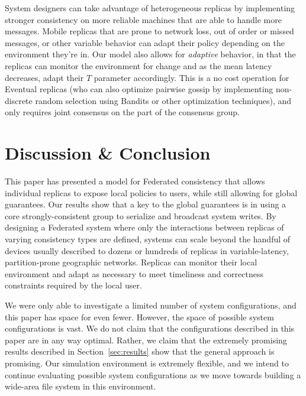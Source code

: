 \documentclass[10pt,conference,letterpaper]{IEEEtran}
\begin{document}
System designers can take advantage of heterogeneous replicas by implementing
stronger consistency on more reliable machines that are able to handle more
messages.
Mobile replicas that are prone to network loss, out of order or missed
messages, or other variable behavior can adapt their policy depending on the
environment they're in.
Our model also allows for \textit{adaptive} behavior, in that the replicas can
monitor the environment for change and as the mean latency decreases, adapt
their $T$ parameter accordingly.
This is a no cost operation for Eventual replicas (who can also optimize
pairwise gossip by implementing non-discrete random selection using Bandits or
other optimization techniques), and only requires joint consensus on the part
of the consensus group.

\section{Discussion \& Conclusion}
\label{sec:conclusion}

This paper has presented a model for Federated consistency that allows
individual replicas to expose local policies to users, while still allowing
for global guarantees.
Our results show that a key to the global guarantees is in using a core
strongly-consistent group to serialize and broadcast system writes.
By designing a Federated system where only the interactions between replicas
of varying consistency types are defined, systems can scale beyond the handful
of devices usually described to dozens or hundreds of replicas in
variable-latency, partition-prone geographic networks.
Replicas can monitor their local environment and adapt as necessary to meet
timeliness and correctness constraints required by the local user.

We were only able to investigate a limited number of system configurations,
and this paper has space for even fewer.
However, the space of possible system configurations is vast.
We do not claim that the configurations described in this paper are in any way
optimal. Rather, we claim that the extremely promising results described in
Section~\ref{sec:results} show that the general approach is promising. 
Our simulation environment is extremely flexible, and we intend to continue
evaluating possible system configurations as we move towards building a
wide-area file system in this environment.
\end{document}
